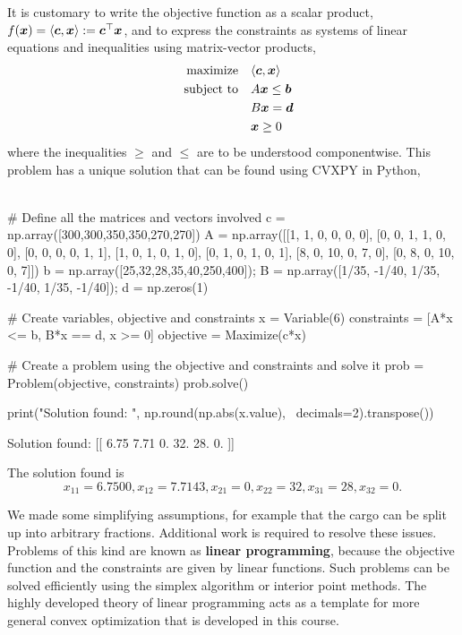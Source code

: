 \begin{example}
 It is customary to write the objective function as a scalar product, $f(\bm{x}) = \langle {\bm{c}}, {\bm{x}} \rangle := \bm{c}^{\top}\bm{x}$, and to express the constraints as systems of linear equations and inequalities using matrix-vector products,
 \begin{align*}
  \text{maximize}\quad &\langle {\bm{c}}, {\bm{x}} \rangle \\
  \quad\text{subject to}\quad &A\bm{x}\leq \bm{b}\\
  & B\bm{x} = \bm{d}\\
          & \bm{x}\geq 0        
 \end{align*}
where the inequalities $\geq$ and $\leq$ are to be understood componentwise.
 This problem has a unique solution that can be found using CVXPY in Python,
 
\begin{ipythonnb}[8]
\\# Define all the matrices and vectors involved
c = np.array([300,300,350,350,270,270])
A = np.array([[1, 1, 0, 0, 0, 0],
              [0, 0, 1, 1, 0, 0],
              [0, 0, 0, 0, 1, 1],
              [1, 0, 1, 0, 1, 0],
              [0, 1, 0, 1, 0, 1],
              [8, 0, 10, 0, 7, 0],
              [0, 8, 0, 10, 0, 7]])
b = np.array([25,32,28,35,40,250,400]);
B = np.array([1/35, -1/40, 1/35, -1/40, 1/35, -1/40]);
d = np.zeros(1)

# Create variables, objective and constraints
x = Variable(6)
constraints = [A*x <= b, B*x == d, x >= 0]
objective = Maximize(c*x)

# Create a problem using the objective and constraints and solve it
prob = Problem(objective, constraints)
prob.solve()

print("Solution found: \n", np.round(np.abs(x.value), \
  decimals=2).transpose())
\end{ipythonnb}
\begin{ipythonnboutno}
Solution found: 
 [[  6.75   7.71   0.    32.    28.     0.  ]]
\end{ipythonnboutno}

The solution found is
 \begin{equation*}
 x_{11} = 6.7500 , x_{12} =  7.7143, x_{21} = 0, x_{22} = 32, x_{31} = 28, x_{32} = 0.
 \end{equation*}

 We made some simplifying assumptions, for example that the cargo can be split up into arbitrary fractions. Additional work is required to resolve these issues.
 Problems of this kind are known as \textbf{linear programming}, because the objective function and the constraints are given by linear functions. Such problems can be solved efficiently using the simplex algorithm or interior point methods. The highly developed theory of linear programming acts as a template for more general convex optimization that is developed in this course.
\end{example}
